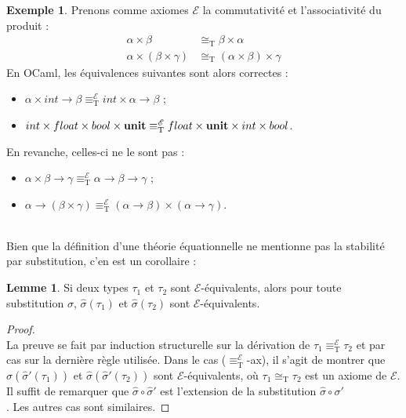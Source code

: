 \documentclass[a4paper]{report}
\newenvironment{preuve} 
  {\begin{proof}~\\} 
  {\end{proof}}
\theoremstyle{definition}
\newtheorem{lemme}[theoreme]{Lemme}
\newtheorem{exemple}[theoreme]{Exemple}
\newcommand{\unit}{\bold{unit}}
\newcommand{\E}{\mathscr{E}}
\newcommand{\T}{\mathrm{T}}
\newcommand\laure[1]{{\bf\color{WildStrawberry}{TODO: #1}}\\}
\begin{document}
\begin{exemple}
  Prenons comme axiomes $\E$ la commutativité et l'associativité du produit :
  \begin{align}
      \alpha \times \beta &\cong_\T
      \beta \times \alpha
      \tag{$\times$-comm}
    \\
      \alpha \times (\beta \times \gamma) &\cong_\T
      (\alpha \times \beta) \times \gamma
      \tag{$\times$-assoc}
  \end{align}
  En OCaml, les équivalences suivantes sont alors correctes :
  \begin{itemize}
    \item $\alpha \times int \rightarrow \beta \equiv_\T^\E int \times \alpha \rightarrow \beta$ ;
    \item $int \times float \times bool \times \unit \equiv_\T^\E float \times \unit \times int \times bool$.
  \end{itemize}
  En revanche, celles-ci ne le sont pas :
  \begin{itemize}
    \item $\alpha \times \beta \rightarrow \gamma \equiv_\T^\E \alpha \rightarrow \beta \rightarrow \gamma$ ;
    \item $\alpha \rightarrow (\beta \times \gamma) \equiv_\T^\E (\alpha \rightarrow \beta) \times (\alpha \rightarrow \gamma)$.
  \end{itemize}
\end{exemple}
\laure{On a donc à ce stade capturé ce que l'on voulait, ie blablabla}


Bien que la définition d'une théorie équationnelle ne mentionne pas la stabilité par substitution, c'en est un corollaire :

\begin{lemme}
  Si deux types $\tau_1$ et $\tau_2$ sont $\E$-équivalents, alors pour toute substitution $\sigma$, $\hat\sigma (\tau_1)$ et $\hat\sigma (\tau_2)$ sont $\E$-équivalents.
\end{lemme}

\begin{preuve}
  La preuve se fait par induction structurelle sur la dérivation de $\tau_1 \equiv_\T^\E \tau_2$ et par cas sur la dernière règle utilisée.
  \smallskip %
  Dans le cas ($\equiv_\T^\E$-ax), il s'agit de montrer que $\hat\sigma (\hat\sigma' (\tau_1))$ et $\hat\sigma (\hat\sigma' (\tau_2))$ sont $\E$-équivalents, où $\tau_1 \cong_\T \tau_2$ est un axiome de $\E$. Il suffit de remarquer que $\hat\sigma \circ \hat\sigma'$ est l'extension de la substitution $\hat\sigma \circ \sigma'$ \laure{extension : undefined word}. Les autres cas sont similaires. %
\end{preuve}
\end{document}
